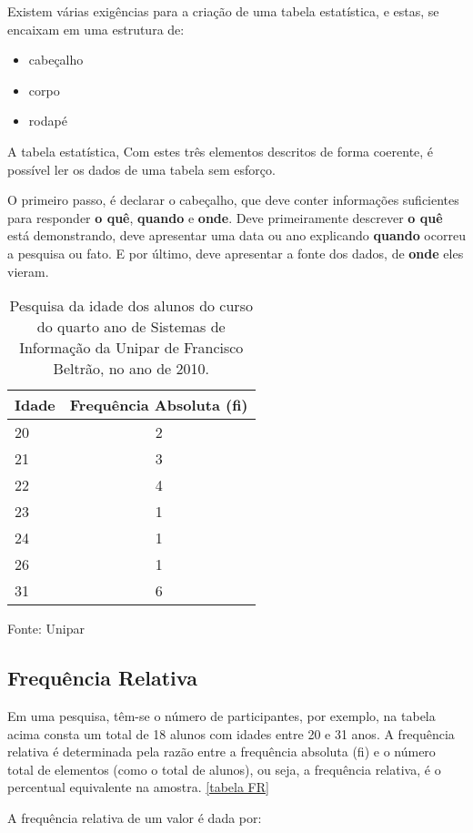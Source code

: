 \documentclass[espaco=simples,appendix=Name]{abnt}
\newcommand{\code}[1] {\textbf{#1}}
\begin{document}
Existem várias exigências para a criação de uma tabela estatística, e estas, se encaixam em uma estrutura de:


\begin{itemize} 
  \item{cabeçalho}
  \item{corpo}
  \item{rodapé}
\end{itemize} 

A tabela estatística, Com estes três elementos descritos de forma coerente, é possível ler os dados de uma tabela sem esforço. 

O primeiro passo, é declarar o cabeçalho, que deve conter informações suficientes para responder \code{o quê}, \textbf{quando} e \textbf{onde}. Deve primeiramente descrever \textbf{o quê} está demonstrando, deve apresentar uma data ou ano explicando \textbf{quando} ocorreu a pesquisa ou fato. E por último, deve apresentar a fonte dos dados, de \textbf{onde} eles vieram.

\begin{table}
\caption{Pesquisa da idade dos alunos do curso do quarto ano de Sistemas de Informação da Unipar de Francisco Beltrão, no ano de 2010.}
\begin{tabular}{|l|c|} 
\hline 
Idade & Frequência Absoluta (\code{fi}) \\ \hline 
20 & 2 \\
21 & 3 \\
22 & 4 \\
23 & 1 \\
24 & 1 \\
26 & 1 \\
31 & 6 \\ 
\hline 
\end{tabular}
\small{Fonte: Unipar}
\end{table}

\subsection { Frequência Relativa }


Em uma pesquisa, têm-se o número de participantes, por exemplo, na tabela acima consta um total de 18 alunos com idades entre 20 e 31 anos. A frequência relativa é determinada pela razão entre a frequência absoluta (fi) e o número total de elementos (como o total de alunos), ou seja, a frequência relativa, é o percentual equivalente na amostra. \ref{tabela FR}

A frequência relativa de um valor é dada por:
\end{document}
